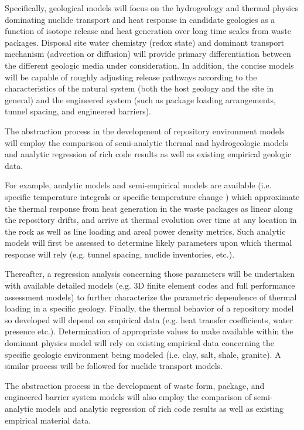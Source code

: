 Specifically, geological models will focus on the hydrogeology and 
thermal physics dominating nuclide transport and heat response in 
candidate geologies as a function of isotope release and heat 
generation over long time scales from waste packages.  Disposal site 
water chemistry (redox state) and dominant transport mechanism 
(advection or diffusion) will provide primary differentiation between 
the different geologic media under consideration. In addition, the 
concise models will be capable of roughly adjusting release pathways 
according to the characteristics of the natural system (both the host 
geology and the site in general) and the engineered system (such as 
package loading arrangements, tunnel spacing, and engineered 
barriers).

The abstraction process in the development of repository environment 
models will employ the comparison of semi-analytic thermal and 
hydrogeologic models and analytic regression of rich code results as 
well as existing empirical geologic data.  

For example, analytic models and semi-empirical models are available 
(i.e. specific temperature integrals \cite{li_methodology_2004} or 
specific temperature change \cite{radel_wilson_2004}) which 
approximate the thermal response from heat generation in the waste 
packages as linear along the repository drifts, and arrive at thermal 
evolution over time at any location in the rock as well as line 
loading and areal power density metrics.  Such analytic models will 
first be assessed to determine likely parameters upon which thermal 
response will rely (e.g. tunnel spacing, nuclide inventories, etc.).

Thereafter, a regression analysis concerning those parameters will be 
undertaken with available detailed models (e.g. 3D finite element 
codes and full performance assessment models) to further characterize 
the parametric dependence of thermal loading in a specific geology. 
Finally, the thermal behavior of a repository model so developed will 
depend on empirical data (e.g.  heat transfer coefficients, water 
presence etc.). Determination of appropriate values to make available 
within the dominant physics model will rely on existing empirical data 
concerning the specific geologic environment being modeled (i.e. clay, 
salt, shale, granite). A similar process will be followed for nuclide 
transport models.

The abstraction process in the development of waste form, package, and 
engineered barrier system models will also employ the comparison of 
semi-analytic models and analytic regression of rich code results as 
well as existing empirical material data. 

